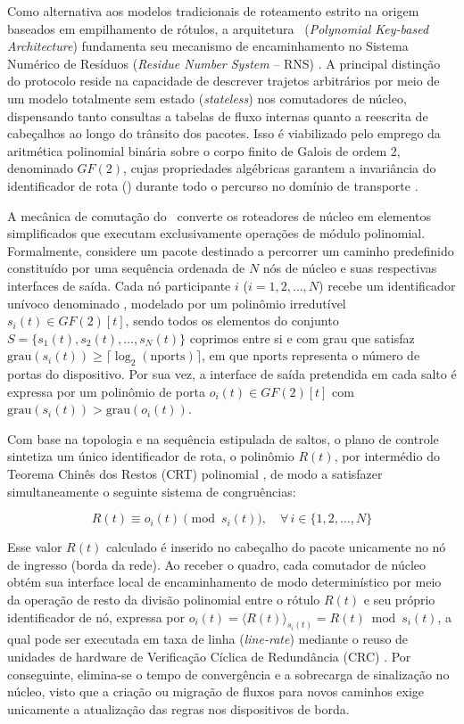 Como alternativa aos modelos tradicionais de roteamento estrito na origem baseados em empilhamento de rótulos, a arquitetura \polka\ (\textit{Polynomial Key-based Architecture}) fundamenta seu mecanismo de encaminhamento no Sistema Numérico de Resíduos (\textit{Residue Number System} -- RNS) \cite{dominicini2020, Bajard2007}. A principal distinção do protocolo reside na capacidade de descrever trajetos arbitrários por meio de um modelo totalmente sem estado (\textit{stateless}) nos comutadores de núcleo, dispensando tanto consultas a tabelas de fluxo internas quanto a reescrita de cabeçalhos ao longo do trânsito dos pacotes. Isso é viabilizado pelo emprego da aritmética polinomial binária sobre o corpo finito de Galois de ordem 2, denominado $GF(2)$, cujas propriedades algébricas garantem a invariância do identificador de rota (\routeID) durante todo o percurso no domínio de transporte \cite{dominicini2020}.

A mecânica de comutação do \polka\ converte os roteadores de núcleo em elementos simplificados que executam exclusivamente operações de módulo polinomial. Formalmente, considere um pacote destinado a percorrer um caminho predefinido constituído por uma sequência ordenada de $N$ nós de núcleo e suas respectivas interfaces de saída. Cada nó participante $i$ ($i = 1, 2, \dots, N$) recebe um identificador unívoco denominado \nodeID, modelado por um polinômio irredutível $s_i(t) \in GF(2)[t]$, sendo todos os elementos do conjunto $S = \{s_1(t), s_2(t), \dots, s_N(t)\}$ coprimos entre si e com grau que satisfaz $\text{grau}(s_i(t)) \ge \lceil \log_2(\text{nports}) \rceil$, em que $\text{nports}$ representa o número de portas do dispositivo. Por sua vez, a interface de saída pretendida em cada salto é expressa por um polinômio de porta $o_i(t) \in GF(2)[t]$ com $\text{grau}(s_i(t)) > \text{grau}(o_i(t))$.

Com base na topologia e na sequência estipulada de saltos, o plano de controle sintetiza um único identificador de rota, o polinômio $R(t)$, por intermédio do Teorema Chinês dos Restos (CRT) polinomial \cite{Shoup:2009, dominicini2020}, de modo a satisfazer simultaneamente o seguinte sistema de congruências:

\begin{equation}
\label{eq:polka_crt}
R(t) \equiv o_i(t) \pmod{s_i(t)}, \quad \forall \, i \in \{1, 2, \dots, N\}
\end{equation}

Esse valor $R(t)$ calculado é inserido no cabeçalho do pacote unicamente no nó de ingresso (borda da rede). Ao receber o quadro, cada comutador de núcleo obtém sua interface local de encaminhamento de modo determinístico por meio da operação de resto da divisão polinomial entre o rótulo $R(t)$ e seu próprio identificador de nó, expressa por $o_i(t) = \langle R(t) \rangle_{s_i(t)} = R(t) \bmod s_i(t)$, a qual pode ser executada em taxa de linha (\textit{line-rate}) mediante o reuso de unidades de hardware de Verificação Cíclica de Redundância (CRC) \cite{dominicini2021}. Por conseguinte, elimina-se o tempo de convergência e a sobrecarga de sinalização no núcleo, visto que a criação ou migração de fluxos para novos caminhos exige unicamente a atualização das regras nos dispositivos de borda.

